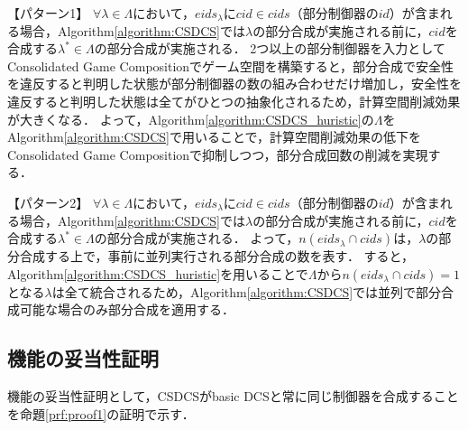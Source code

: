 {\color{red}
【パターン1】
$\forall\lambda \in \Lambda$において，$eids_{\lambda}$に$cid \in cids$（部分制御器の$id$）が含まれる場合，Algorithm\ref{algorithm:CSDCS}では$\lambda$の部分合成が実施される前に，$cid$を合成する$\lambda^* \in \Lambda$の部分合成が実施される．
2つ以上の部分制御器を入力としてConsolidated Game Compositionでゲーム空間を構築すると，部分合成で安全性を違反すると判明した状態が部分制御器の数の組み合わせだけ増加し，安全性を違反すると判明した状態は全てがひとつの抽象化されるため，計算空間削減効果が大きくなる．
よって，Algorithm\ref{algorithm:CSDCS_huristic}の$\Lambda$をAlgorithm\ref{algorithm:CSDCS}で用いることで，計算空間削減効果の低下をConsolidated Game Compositionで抑制しつつ，部分合成回数の削減を実現する．

【パターン2】
$\forall\lambda \in \Lambda$において，$eids_{\lambda}$に$cid \in cids$（部分制御器の$id$）が含まれる場合，Algorithm\ref{algorithm:CSDCS}では$\lambda$の部分合成が実施される前に，$cid$を合成する$\lambda^* \in \Lambda$の部分合成が実施される．
よって，$n(eids_{\lambda} \cap cids)$は，$\lambda$の部分合成する上で，事前に並列実行される部分合成の数を表す．
すると，Algorithm\ref{algorithm:CSDCS_huristic}を用いることで$\Lambda$から$n(eids_{\lambda} \cap cids) = 1$となる$\lambda$は全て統合されるため，Algorithm\ref{algorithm:CSDCS}では並列で部分合成可能な場合のみ部分合成を適用する．
}

\subsection{機能の妥当性証明}
機能の妥当性証明として，CSDCSがbasic DCSと常に同じ制御器を合成することを命題\ref{prf:proof1}の証明で示す．

